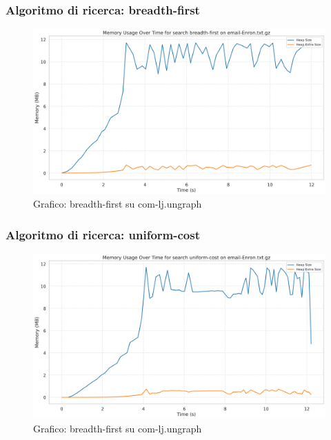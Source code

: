 \documentclass{article}
\begin{document}
\subsubsection{Algoritmo di ricerca: breadth-first}
\begin{figure}[h]\centering
	\includegraphics[width=\textwidth]{../plots/email-Enron_breadth-first.png}
	\caption{Grafico: breadth-first su com-lj.ungraph}
\end{figure}
\subsubsection{Algoritmo di ricerca: uniform-cost}
\begin{figure}[h]\centering
	\includegraphics[width=\textwidth]{../plots/email-Enron_uniform-cost.png}
	\caption{Grafico: breadth-first su com-lj.ungraph}
\end{figure}
\end{document}
